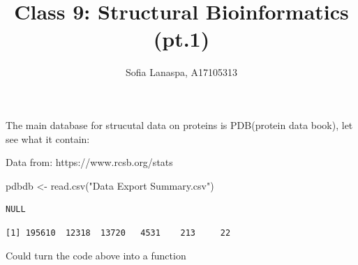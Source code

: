 \documentclass[
  letterpaper,
  DIV=11,
  numbers=noendperiod]{scrartcl}
\title{Class 9: Structural Bioinformatics (pt.1)}
\author{Sofia Lanaspa, A17105313}
\date{}
\newenvironment{Shaded}{\begin{snugshade}}{\end{snugshade}}
\newcommand{\CommentTok}[1]{\textcolor[rgb]{0.37,0.37,0.37}{#1}}
\newcommand{\ControlFlowTok}[1]{\textcolor[rgb]{0.00,0.23,0.31}{\textbf{#1}}}
\newcommand{\FunctionTok}[1]{\textcolor[rgb]{0.28,0.35,0.67}{#1}}
\newcommand{\NormalTok}[1]{\textcolor[rgb]{0.00,0.23,0.31}{#1}}
\newcommand{\OtherTok}[1]{\textcolor[rgb]{0.00,0.23,0.31}{#1}}
\newcommand{\SpecialCharTok}[1]{\textcolor[rgb]{0.37,0.37,0.37}{#1}}
\newcommand{\StringTok}[1]{\textcolor[rgb]{0.13,0.47,0.30}{#1}}
\begin{document}
\maketitle


The main database for strucutal data on proteins is PDB(protein data
book), let see what it contain:

Data from: https://www.rcsb.org/stats

\begin{Shaded}
\begin{Highlighting}[]
\NormalTok{pdbdb }\OtherTok{\textless{}{-}} \FunctionTok{read.csv}\NormalTok{(}\StringTok{"Data Export Summary.csv"}\NormalTok{)}
\end{Highlighting}
\end{Shaded}

\begin{Shaded}
\end{Shaded}

\begin{verbatim}
NULL
\end{verbatim}

\begin{Shaded}
\end{Shaded}

\begin{verbatim}
[1] 195610  12318  13720   4531    213     22
\end{verbatim}

Could turn the code above into a function

\begin{Shaded}
\end{Shaded}
\end{document}
